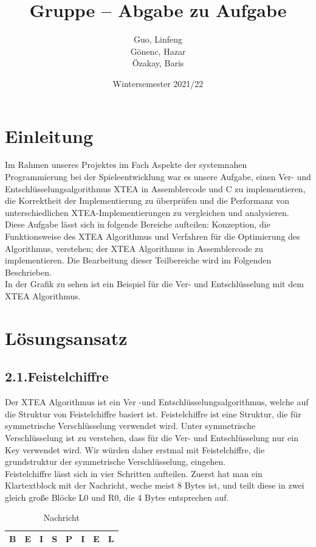\documentclass[course=asp]{aspdoc}
\author{Guo, Linfeng\\Gönenc, Hazar \\Özakay, Baris}
\date{Wintersemester 2021/22}
\title{Gruppe \theGroup{} -- Abgabe zu Aufgabe \theNumber}
\begin{document}
\maketitle



\section{Einleitung}
Im Rahmen unseres Projektes im Fach Aspekte der systemnahen Programmierung bei der Spieleentwicklung war es unsere Aufgabe, einen Ver- und Entschlüsselungsalgorithmus XTEA in Assemblercode und C zu implementieren, die Korrektheit der Implementierung zu überprüfen und die Performanz von unterschiedlichen XTEA-Implementierungen zu vergleichen und analysieren. Diese Aufgabe lässt sich in folgende Bereiche aufteilen: Konzeption, die Funktionsweise des XTEA Algorithmus und Verfahren für die Optimierung des Algorithmus, verstehen; der XTEA Algorithmus in Assemblercode zu implementieren. Die Bearbeitung dieser Teilbereiche wird im Folgenden Beschrieben.  \\In der Grafik zu sehen ist ein Beispiel für die Ver- und Entschlüsselung mit dem XTEA Algorithmus.

\newpage
\section{Lösungsansatz}
\subsection*{2.1.Feistelchiffre }
Der XTEA Algorithmus ist ein Ver -und Entschlüsselungsalgorithmus, welche auf die Struktur von Feistelchiffre basiert ist. Feistelchiffre ist eine Struktur, die für symmetrische Verschlüsselung verwendet wird. Unter symmetrische Verschlüsselung ist zu verstehen, dass für die Ver- und Entschlüsselung nur ein Key verwendet wird. Wir würden daher erstmal mit Feistelchiffre, die grundstruktur der symmetrische Verschlüsselung, eingehen.\\
Feistelchiffre lässt sich in vier Schritten aufteilen. Zuerst hat man ein Klartextblock mit der Nachricht, weche meist 8 Bytes ist, und teilt diese in zwei gleich große Bl\"ocke L0 und R0, die 4 Bytes entsprechen auf.

\begin{table}[H]
\centering
    \begin{tabular}{|l|l|l|l|l|l|l|l|}
        \hline
        B & E & I & S & P & I & E & L   \\
        \hline
    \end{tabular}
    \caption{Nachricht}
\end{table}
\end{document}
